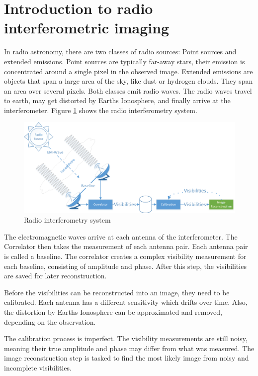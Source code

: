 \section{Introduction to radio interferometric imaging}\label{radio}
In radio astronomy, there are two classes of radio sources: Point sources and extended emissions. Point sources are typically far-away stars, their emission is concentrated around a single pixel in the observed image. Extended emissions are objects that span a large area of the sky, like dust or hydrogen clouds. They span an area over several pixels. Both classes emit radio waves. The radio waves travel to earth, may get distorted by Earths Ionosphere, and finally arrive at the interferometer. Figure \ref{intro:system} shows the radio interferometry system.

\begin{figure}[h]
	\centering
	\includegraphics[width=1.0\linewidth]{./chapters/01.intro/system.png}
	\caption{Radio interferometry system}
	\label{intro:system}
\end{figure}

The electromagnetic waves arrive at each antenna of the interferometer. The Correlator then takes the measurement of each antenna pair. Each antenna pair is called a baseline. The correlator creates a complex visibility measurement for each baseline, consisting of amplitude and phase. After this step, the visibilities are saved for later reconstruction.

Before the visibilities can be reconstructed into an image, they need to be calibrated. Each antenna has a different sensitivity which drifts over time. Also,  the distortion by Earths Ionosphere can be approximated and removed, depending on the observation. 

The calibration process is imperfect. The visibility measurements are still noisy, meaning their true amplitude and phase may differ from what was measured. The image reconstruction step is tasked to find the most likely image from noisy and incomplete visibilities.

